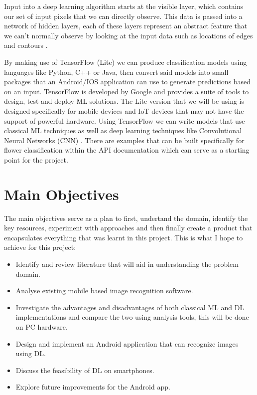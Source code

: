 \documentclass[12pt,a4paper]{report}
\begin{document}
\par

Input into a deep learning algorithm starts at the visible layer, which contains our set of input pixels that we can 
directly observe. This data is passed into a network of hidden layers, each of these layers represent an abstract 
feature that we can't normally observe by looking at the input data such as locations of edges and contours 
\citep[p. 26]{goodfellow2016deep}.

\par

By making use of TensorFlow (Lite) we can produce classification models using languages like Python, C++ or Java, then 
convert said models into small packages that an Android/IOS application can use to generate predictions based on an 
input. TensorFlow is developed by Google and provides a suite of tools to design, test and 
deploy ML solutions. The Lite version that we will be using is designed specifically for mobile devices and IoT devices 
that may not have the support of powerful hardware. Using TensorFlow we can write models that use classical ML 
techniques as well as deep learning techniques like Convolutional Neural Networks (CNN) \citep{googleTF2}. 
There are examples that can be built specifically for flower classification within the API documentation which can serve
as a starting point for the project.

\section{Main Objectives}
The main objectives serve as a plan to first, undertand the domain, 
identify the key resources, experiment with approaches and then finally create a product that encapsulates 
everything that was learnt in this project. This is what I hope to achieve for this project:
\begin{itemize}
    \item Identify and review literature that will aid in understanding the problem domain.
    \item Analyse existing mobile based image recognition software.
    \item Investigate the advantages and disadvantages of both classical ML and DL implementations and compare the two 
using analysis tools, this will be done on PC hardware.
    \item Design and implement an Android application that can recognize images using DL.
    \item Discuss the feasibility of DL on smartphones.
    \item Explore future improvements for the Android app.
\end{itemize}
\end{document}
